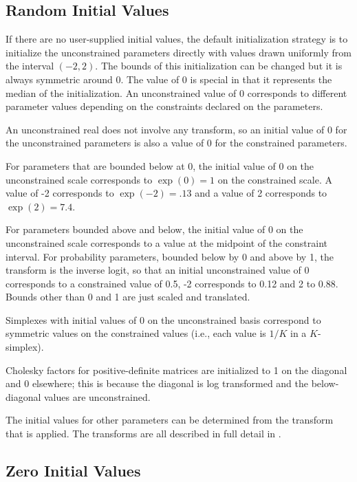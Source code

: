 \subsection{Random Initial Values}

If there are no user-supplied initial values, the default
initialization strategy is to initialize the unconstrained parameters
directly with values drawn uniformly from the interval $(-2,2)$.  The
bounds of this initialization can be changed but it is always
symmetric around 0. The value of 0 is special in that it represents
the median of the initialization.  An unconstrained value of 0
corresponds to different parameter values depending on the constraints
declared on the parameters.

An unconstrained real does not involve any transform, so an initial
value of 0 for the unconstrained parameters is also a value of 0 for
the constrained parameters.  

For parameters that are bounded below at 0, the initial value of 0 on
the unconstrained scale corresponds to $\exp(0) = 1$ on the
constrained scale.  A value of -2 corresponds to $\exp(-2) = .13$ and
a value of 2 corresponds to $\exp(2) = 7.4$.

For parameters bounded above and below, the initial value of 0 on the
unconstrained scale corresponds to a value at the midpoint of the
constraint interval.  For probability parameters, bounded below by 0
and above by 1, the transform is the inverse logit, so that an initial
unconstrained value of 0 corresponds to a constrained value of 0.5, -2
corresponds to 0.12 and 2 to 0.88.  Bounds other than 0 and 1 are
just scaled and translated.

Simplexes with initial values of 0 on the unconstrained basis
correspond to symmetric values on the constrained values (i.e., each
value is $1/K$ in a $K$-simplex).

Cholesky factors for positive-definite matrices are initialized to 1
on the diagonal and 0 elsewhere;  this is because the diagonal is log
transformed and the below-diagonal values are unconstrained.

The initial values for other parameters can be determined from the
transform that is applied.  The transforms are all described in full
detail in .

\subsection{Zero Initial Values}

